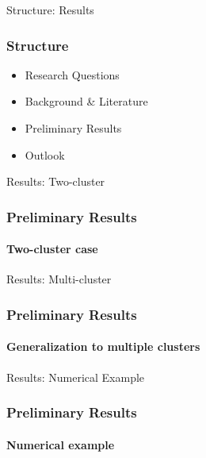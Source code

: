 \begin{frame}[label=results]{Structure: Results}
    \frametitle{Structure}
    \begin{itemize}
        \item Research Questions
        \item Background \& Literature
        \item {\color{tud grapefruit}Preliminary Results}
        \item Outlook
    \end{itemize}
\end{frame}

\begin{frame}[label=results]{Results: Two-cluster}
    \frametitle{Preliminary Results}
    \framesubtitle{Two-cluster case}
\end{frame}

\begin{frame}[label=results]{Results: Multi-cluster}
    \frametitle{Preliminary Results}
    \framesubtitle{Generalization to multiple clusters}
\end{frame}

\begin{frame}[label=results]{Results: Numerical Example}
    \frametitle{Preliminary Results}
    \framesubtitle{Numerical example}
\end{frame}
